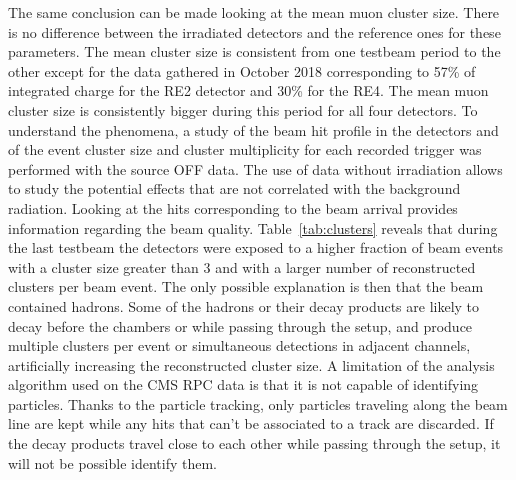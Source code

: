 	The same conclusion can be made looking at the mean muon cluster size. There is no difference between the irradiated detectors and the reference ones for these parameters. The mean cluster size is consistent from one testbeam period to the other except for the data gathered in October 2018 corresponding to 57\% of integrated charge for the RE2 detector and 30\% for the RE4. The mean muon cluster size is consistently bigger during this period for all four detectors. To understand the phenomena, a study of the beam hit profile in the detectors and of the event cluster size and cluster multiplicity for each recorded trigger was performed with the source OFF data. The use of data without irradiation allows to study the potential effects that are not correlated with the background radiation. Looking at the hits corresponding to the beam arrival provides information regarding the beam quality. Table~\ref{tab:clusters} reveals that during the last testbeam the detectors were exposed to a higher fraction of beam events with a cluster size greater than 3 and with a larger number of reconstructed clusters per beam event. The only possible explanation is then that the beam contained hadrons. Some of the hadrons or their decay products are likely to decay before the chambers or while passing through the setup, and produce multiple clusters per event or simultaneous detections in adjacent channels, artificially increasing the reconstructed cluster size. A limitation of the analysis algorithm used on the CMS RPC data is that it is not capable of identifying particles. Thanks to the particle tracking, only particles traveling along the beam line are kept while any hits that can't be associated to a track are discarded. If the decay products travel close to each other while passing through the setup, it will not be possible identify them.
	

